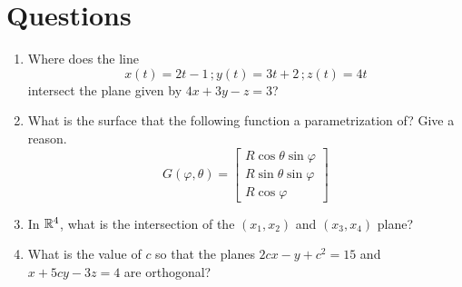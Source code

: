 \documentclass[12pt]{amsart}
\begin{document}
\section*{Questions}
\begin{problem}
    \begin{enumerate}
        \item Where does the line 
    \begin{equation*}
        x(t) = 2t-1 \,; y(t) = 3t + 2 \,; z(t) = 4t
    \end{equation*}
    intersect the plane given by $4x + 3y - z = 3$?
    \vspace{7cm}

\item What is the surface that the following function a parametrization of?
        Give a reason.
    \begin{equation*}
        G(\varphi, \theta) = \begin{bmatrix}
            R \cos \theta \sin \varphi \\
            R \sin \theta \sin \varphi \\
            R \cos \varphi
        \end{bmatrix}
    \end{equation*}

    \vspace{7cm}

    \newpage
\item 
    In $\mathbb{R}^4$, what is the intersection of the $(x_1, x_2)$ and $(x_3, x_4)$ plane?

    \vspace{10cm}

\item 
    What is the value of $c$ so that the planes
    $2cx - y + c^2 = 15$ and $x + 5cy - 3z = 4$ are orthogonal?
    \end{enumerate}
\end{problem}

\newpage
\end{document}
